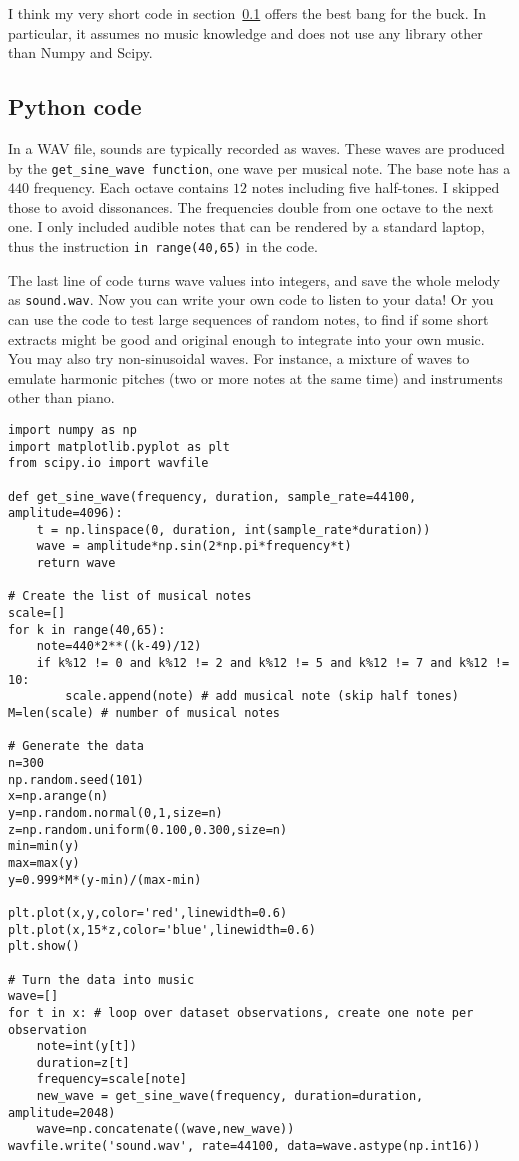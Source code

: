 \documentclass[oneside,10pt]{book}
\begin{document}
I think my very short code in section~\ref{cvbxc} offers the best bang for the buck. In particular, it assumes no music knowledge and does not use any library other than Numpy and Scipy.

\subsection{Python code}\label{cvbxc}

In a WAV file, sounds are typically recorded as waves. These waves are produced by the \texttt{get\_sine\_wave function}, one wave per musical note. The base note has a $440$ frequency. Each octave contains $12$ notes including five half-tones. I skipped those to avoid dissonances. The frequencies double from one octave to the next one. I only included audible notes that can be rendered by a standard laptop, thus the instruction \texttt{in range(40,65)} in the code.

The last line of code turns wave values into integers, and save the whole melody as \texttt{sound.wav}. Now you can write your own code to listen to your data! Or you can use the code to test large sequences of random notes, to find if some short extracts might be good and original enough to integrate into your own music. You may also try non-sinusoidal waves. For instance, a mixture of waves to emulate harmonic pitches (two or more notes at the same time) and instruments other than piano. \\



\begin{lstlisting}
import numpy as np
import matplotlib.pyplot as plt
from scipy.io import wavfile

def get_sine_wave(frequency, duration, sample_rate=44100, amplitude=4096):
    t = np.linspace(0, duration, int(sample_rate*duration))
    wave = amplitude*np.sin(2*np.pi*frequency*t)
    return wave

# Create the list of musical notes
scale=[] 
for k in range(40,65):
    note=440*2**((k-49)/12)
    if k%12 != 0 and k%12 != 2 and k%12 != 5 and k%12 != 7 and k%12 != 10:
        scale.append(note) # add musical note (skip half tones)
M=len(scale) # number of musical notes

# Generate the data
n=300
np.random.seed(101)
x=np.arange(n)
y=np.random.normal(0,1,size=n)
z=np.random.uniform(0.100,0.300,size=n)
min=min(y)
max=max(y)
y=0.999*M*(y-min)/(max-min)

plt.plot(x,y,color='red',linewidth=0.6)
plt.plot(x,15*z,color='blue',linewidth=0.6)
plt.show()
  
# Turn the data into music
wave=[]
for t in x: # loop over dataset observations, create one note per observation
    note=int(y[t])
    duration=z[t]
    frequency=scale[note]    
    new_wave = get_sine_wave(frequency, duration=duration, amplitude=2048)
    wave=np.concatenate((wave,new_wave))
wavfile.write('sound.wav', rate=44100, data=wave.astype(np.int16))
\end{lstlisting}
\end{document}
